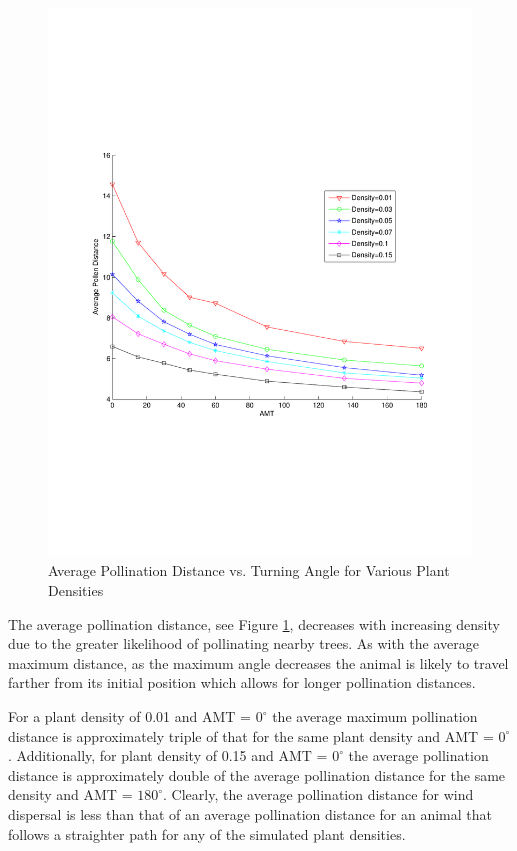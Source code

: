 \documentclass{tran-l}
\theoremstyle{definition}
\theoremstyle{remark}
\numberwithin{equation}{subsection}
\begin{document}
\begin{figure}
  \begin{center}
  \includegraphics[width=1.0\textwidth]{PollenDVsAMT.pdf}
  \end{center}
  \caption{\small Average Pollination Distance vs. Turning Angle for Various
Plant Densities}
  \label{AvgDist}
\end{figure}

The average pollination distance, see Figure \ref{AvgDist}, decreases with increasing density due to the greater likelihood of pollinating nearby trees.  As with the average maximum distance, as the maximum angle decreases the animal is likely to travel farther from its initial position which allows for longer pollination distances.

For a plant density of 0.01 and AMT = $0^\circ$ the average maximum pollination
distance is approximately triple of that for the same plant density and AMT =
$0^\circ$. Additionally, for plant density of 0.15 and AMT = $0^\circ$ the
average pollination distance is approximately double of the average pollination
distance for the same density and AMT = $180^\circ$. Clearly, the average
pollination distance for wind dispersal is less than that of an average
pollination distance for an animal that follows a straighter path for any of the simulated plant densities.
\end{document}
